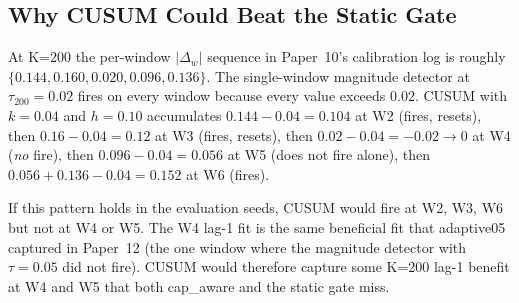 \subsection{Why CUSUM Could Beat the Static Gate}

At K=200 the per-window $|\Delta_w|$ sequence in Paper~10's
calibration log is roughly $\{0.144, 0.160, 0.020, 0.096, 0.136\}$.
The single-window magnitude detector at $\tau_{200} = 0.02$ fires
on every window because every value exceeds $0.02$. CUSUM with
$k = 0.04$ and $h = 0.10$ accumulates $0.144 - 0.04 = 0.104$ at W2
(fires, resets), then $0.16 - 0.04 = 0.12$ at W3 (fires, resets),
then $0.02 - 0.04 = -0.02 \to 0$ at W4 (\textit{no} fire), then
$0.096 - 0.04 = 0.056$ at W5 (does not fire alone), then
$0.056 + 0.136 - 0.04 = 0.152$ at W6 (fires).

If this pattern holds in the evaluation seeds, CUSUM would fire at
W2, W3, W6 but not at W4 or W5. The W4 lag-1 fit is the same
beneficial fit that adaptive05 captured in Paper~12 (the one window
where the magnitude detector with $\tau = 0.05$ did not fire). CUSUM
would therefore capture some K=200 lag-1 benefit at W4 and W5 that
both cap\_aware and the static gate miss.
